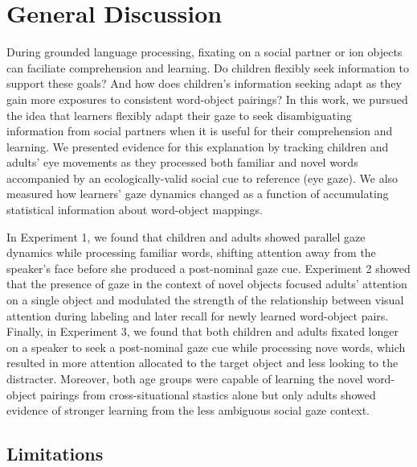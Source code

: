 \documentclass[man,floatsintext]{apa6}
\begin{document}
\section{General Discussion}\label{general-discussion}

During grounded language processing, fixating on a social partner or ion
objects can faciliate comprehension and learning. Do children flexibly
seek information to support these goals? And how does children's
information seeking adapt as they gain more exposures to consistent
word-object pairings? In this work, we pursued the idea that learners
flexibly adapt their gaze to seek disambiguating information from social
partners when it is useful for their comprehension and learning. We
presented evidence for this explanation by tracking children and adults'
eye movements as they processed both familiar and novel words
accompanied by an ecologically-valid social cue to reference (eye gaze).
We also measured how learners' gaze dynamics changed as a function of
accumulating statistical information about word-object mappings.

In Experiment 1, we found that children and adults showed parallel gaze
dynamics while processing familiar words, shifting attention away from
the speaker's face before she produced a post-nominal gaze cue.
Experiment 2 showed that the presence of gaze in the context of novel
objects focused adults' attention on a single object and modulated the
strength of the relationship between visual attention during labeling
and later recall for newly learned word-object pairs. Finally, in
Experiment 3, we found that both children and adults fixated longer on a
speaker to seek a post-nominal gaze cue while processing nove words,
which resulted in more attention allocated to the target object and less
looking to the distracter. Moreover, both age groups were capable of
learning the novel word-object pairings from cross-situational stastics
alone but only adults showed evidence of stronger learning from the less
ambiguous social gaze context.

\subsection{Limitations}\label{limitations-1}
\end{document}
